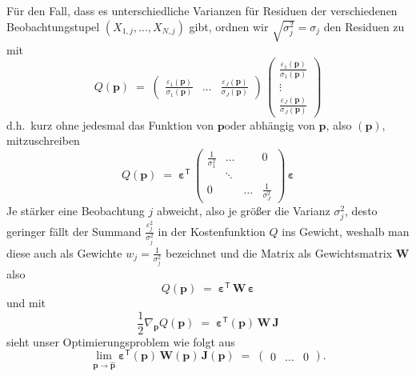 Für den Fall, dass es unterschiedliche Varianzen für Residuen der verschiedenen Beobachtungstupel
$(X_{1,j},\dots,X_{N,j})$ gibt, ordnen wir $\sqrt{\sigma_j^2} = \sigma_j$
den Residuen zu mit
\begin{equation}
Q(\mathbf{p}) \; = \;
  \left(\begin{array}{ccc}
  \frac{\varepsilon_1(\mathbf{p})}{\sigma_1(\mathbf{p})} & \dots &
 \frac{\varepsilon_J(\mathbf{p})}{\sigma_J(\mathbf{p})} \end{array} \right)
\, \left(\begin{array}{c} \frac{\varepsilon_1(\mathbf{p})}{\sigma_1(\mathbf{p})}\\
 \vdots\\ \frac{\varepsilon_J(\mathbf{p})}{\sigma_J(\mathbf{p})}\end{array} \right)
\label{ZielfunktionalJmitW}
\end{equation}
d.h.\ kurz ohne jedesmal das \glqq Funktion von $\mathbf{p}$\grqq oder
\glqq abhängig von $\mathbf{p}$\grqq, also $(\mathbf{p})$,
mitzuschreiben
\begin{equation}
Q(\mathbf{p}) \; = \;
  \boldsymbol{\varepsilon}^\textsf{T}
\, \left(\begin{array}{cccc} \frac{1}{\sigma_1^2} & \dots & & 0 \\
  & \ddots & \\
 0 & & \dots &  \frac{1}{\sigma_J^2} \end{array} \right) \, \boldsymbol{\varepsilon}
\label{ZielfunktionalJmitW1}
\end{equation}
Je stärker eine Beobachtung $j$ abweicht, also je größer die Varianz $\sigma_j^2$,
desto geringer fällt der Summand $\frac{\varepsilon_j^2}{\sigma_j^2}$ in der Kostenfunktion $Q$
ins Gewicht, weshalb man diese auch als Gewichte $w_j = \frac{1}{\sigma_j^2}$ bezeichnet
und die Matrix als Gewichtsmatrix $\mathbf{W}$ also
\begin{equation}
Q(\mathbf{p}) \; = \;
  \boldsymbol{\varepsilon}^\textsf{T}
\, \mathbf{W} \, \boldsymbol{\varepsilon}
\label{ZielfunktionalJmitW2}
\end{equation}
und mit
\begin{equation}
\frac{1}{2} \nabla_{\mathbf{p}} Q(\mathbf{p})  \; = \; \boldsymbol{\varepsilon}^\textsf{T}(\mathbf{p})
 \, \mathbf{W} \, \boldsymbol{J}
\label{ZielfunktionalGradJW}
\end{equation}
sieht unser Optimierungsproblem wie folgt aus
\begin{equation}
\lim_{\mathbf{p} \rightarrow \mathbf{\hat p}}
\boldsymbol{\varepsilon}^\textsf{T}(\mathbf{p})
 \, \mathbf{W}(\mathbf{p}) \, \boldsymbol{J}(\mathbf{p})
 \; = \; \left(\begin{array}{ccc} 0 & \dots & 0 \end{array}\right) .
\label{ZielfunktionalGrad1W}
\end{equation}
